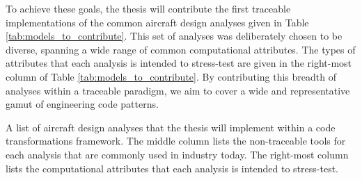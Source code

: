 \documentclass[12pt,vi,oneside,table]{report}
\begin{document}
    To achieve these goals, the thesis will contribute the first traceable implementations of the common aircraft design analyses given in Table \ref{tab:models_to_contribute}. This set of analyses was deliberately chosen to be diverse, spanning a wide range of common computational attributes. The types of attributes that each analysis is intended to stress-test are given in the right-most column of Table \ref{tab:models_to_contribute}. By contributing this breadth of analyses within a traceable paradigm, we aim to cover a wide and representative gamut of engineering code patterns.

    \begin{table}[H]

        \centering
        \caption{A list of aircraft design analyses that the thesis will implement within a code transformations framework. The middle column lists the non-traceable tools for each analysis that are commonly used in industry today. The right-most column lists the computational attributes that each analysis is intended to stress-test.}
        \label{tab:models_to_contribute}

        \begin{adjustbox}{width=\textwidth}


\end{adjustbox}
\end{table}
\end{document}
